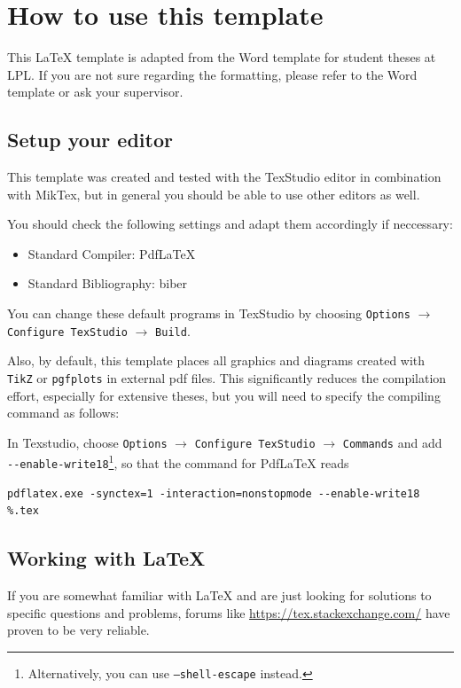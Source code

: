 \chapter{How to use this template}
This \LaTeX{} template is adapted from the Word template for student theses at LPL. If you are not sure regarding
the formatting, please refer to the Word template or ask your supervisor.


\section{Setup your editor}
This template was created and tested with the TexStudio editor in combination with MikTex, but in general you should be able to use other editors as well.


You should check the following settings and adapt them accordingly if neccessary:
\begin{itemize}
	\item Standard Compiler: Pdf\LaTeX
	\item Standard Bibliography: biber
\end{itemize}
You can change these default programs in TexStudio by choosing \texttt{Options} $\rightarrow$ \texttt{Configure TexStudio} $\rightarrow$ \texttt{Build}.

Also, by default, this template places all graphics and diagrams created with \texttt{TikZ} or \texttt{pgfplots}
in external pdf files. This significantly reduces the compilation effort, especially for
extensive theses, but you will need to specify the compiling command as follows:


In Texstudio, choose \texttt{Options} $\rightarrow$ \texttt{Configure TexStudio} $\rightarrow$ \texttt{Commands} and add\\ \verb|--enable-write18|\footnote{Alternatively, you can use \texttt{--shell-escape} instead.}, so that the command for  Pdf\LaTeX{} reads 

\begin{lstlisting}[numbers=none]
	pdflatex.exe -synctex=1 -interaction=nonstopmode --enable-write18 %.tex
\end{lstlisting}


\section{Working with \LaTeX}

If you are somewhat familiar with \LaTeX{} and are just looking for solutions to specific questions and problems, forums like
\url{https://tex.stackexchange.com/} have proven to be very reliable.

